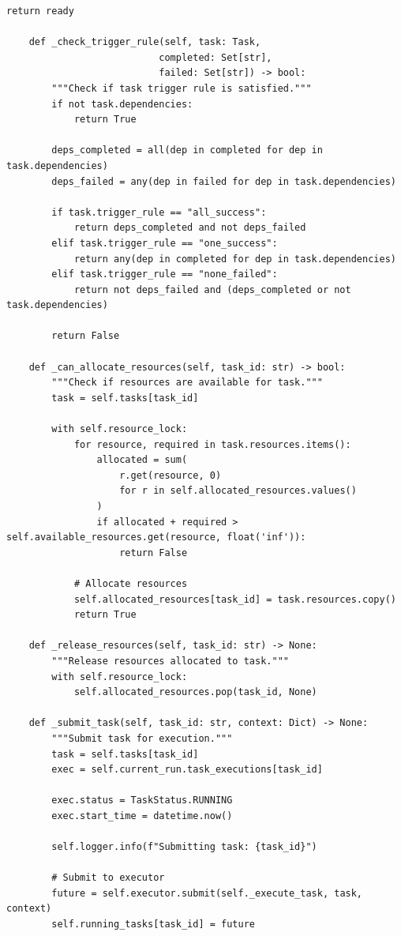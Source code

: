 \begin{lstlisting}[style=python, caption=PipelineOrchestrator with Dependency Management]
        return ready

    def _check_trigger_rule(self, task: Task,
                           completed: Set[str],
                           failed: Set[str]) -> bool:
        """Check if task trigger rule is satisfied."""
        if not task.dependencies:
            return True

        deps_completed = all(dep in completed for dep in task.dependencies)
        deps_failed = any(dep in failed for dep in task.dependencies)

        if task.trigger_rule == "all_success":
            return deps_completed and not deps_failed
        elif task.trigger_rule == "one_success":
            return any(dep in completed for dep in task.dependencies)
        elif task.trigger_rule == "none_failed":
            return not deps_failed and (deps_completed or not task.dependencies)

        return False

    def _can_allocate_resources(self, task_id: str) -> bool:
        """Check if resources are available for task."""
        task = self.tasks[task_id]

        with self.resource_lock:
            for resource, required in task.resources.items():
                allocated = sum(
                    r.get(resource, 0)
                    for r in self.allocated_resources.values()
                )
                if allocated + required > self.available_resources.get(resource, float('inf')):
                    return False

            # Allocate resources
            self.allocated_resources[task_id] = task.resources.copy()
            return True

    def _release_resources(self, task_id: str) -> None:
        """Release resources allocated to task."""
        with self.resource_lock:
            self.allocated_resources.pop(task_id, None)

    def _submit_task(self, task_id: str, context: Dict) -> None:
        """Submit task for execution."""
        task = self.tasks[task_id]
        exec = self.current_run.task_executions[task_id]

        exec.status = TaskStatus.RUNNING
        exec.start_time = datetime.now()

        self.logger.info(f"Submitting task: {task_id}")

        # Submit to executor
        future = self.executor.submit(self._execute_task, task, context)
        self.running_tasks[task_id] = future


\end{lstlisting}
